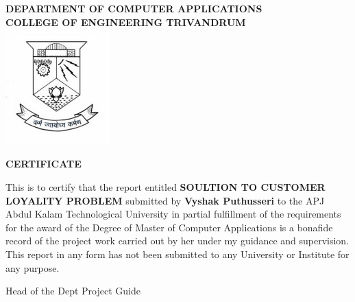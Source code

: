\begin{titlepage}
\begin{center}

\textbf{DEPARTMENT OF COMPUTER APPLICATIONS}\\[0.5cm]
\textbf{ COLLEGE OF ENGINEERING TRIVANDRUM}\\
[0.5cm]

\vspace{1.2cm}
\includegraphics[width=0.30\textwidth]{2.jpg}\\
\vspace{0.8cm}

\large\textbf{CERTIFICATE}\\
\end{center}

This is to certify that the report entitled 
\textbf{SOULTION TO CUSTOMER LOYALITY PROBLEM} submitted by
\textbf{Vyshak Puthusseri} to the APJ Abdul Kalam Technological University in partial
fulfillment of the requirements for the award of the Degree of Master of
Computer Applications is a bonafide record of the project work carried out by
her under my guidance and supervision. This report in any form has not been
submitted to any University or Institute for any purpose.

\vspace{4 cm}

\noindent Head of the Dept
\hfill Project Guide
\\ \\\\


\end{titlepage}
